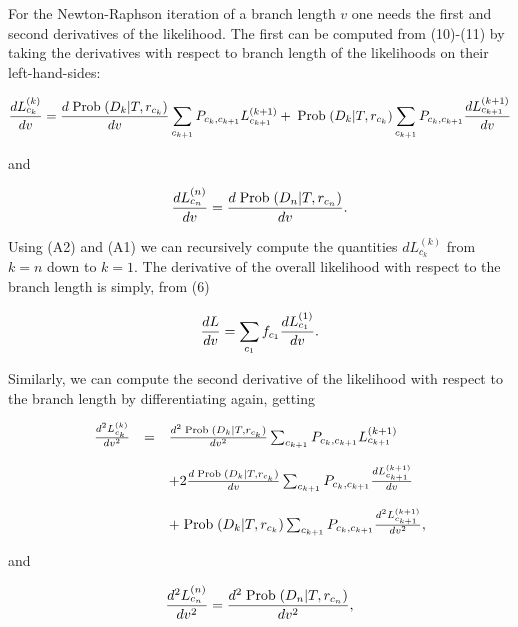 \documentclass[12pt]{article}
\begin{document}
For the Newton-Raphson iteration of a branch length $v$ one needs the first and
second derivatives
of the likelihood.  The first can be computed from (10)-(11) by taking
the derivatives with respect to branch length of the likelihoods on their left-hand-sides:

\begin{equation}%
{dL_{c_k}^{(k)} \over dv} = {d\prob(D_k|T, r_{c_k}) \over dv}\sum_{c_{k+1}} P_{c_k,c_{k+1}} L_{c_{k+1}}^{(k+1)}
+ \prob(D_k|T, r_{c_k})\sum_{c_{k+1}} P_{c_k,c_{k+1}} {dL_{c_{k+1}}^{(k+1)} \over dv}
\end{equation}

and

\begin{equation}%
{dL_{c_n}^{(n)} \over dv} = {d\prob(D_n|T, r_{c_n}) \over dv}.
\end{equation}

Using (A2) and (A1) we can recursively compute the quantities $dL_{c_k}^{(k)}$
from $k=n$ down to $k=1$.   The derivative of the overall likelihood with
respect to the branch length is simply, from (6)

\begin{equation}%
{dL \over dv}  = \sum_{c_1} f_{c_1} {dL_{c_1}^{(1)} \over dv}.
\end{equation}

Similarly, we can compute the second derivative of the likelihood with respect
to the branch length by differentiating again, getting

\begin{equation}%
\begin{array}{c c l}
{d^2L_{c_k}^{(k)} \over dv^2} & = & {d^2\prob(D_k|T, r_{c_k}) \over dv^2}\sum_{c_{k+1}} P_{c_k,c_{k+1}} L_{c_{k+1}}^{(k+1)}\\
& & \\
& & + 2 {d\prob(D_k|T, r_{c_k}) \over dv}\sum_{c_{k+1}} P_{c_k,c_{k+1}} {dL_{c_{k+1}}^{(k+1)} \over dv}\\
& & \\
& & + \prob(D_k|T, r_{c_k})\sum_{c_{k+1}} P_{c_k,c_{k+1}} {d^2L_{c_{k+1}}^{(k+1)} \over dv^2},
\end{array}
\end{equation}

\noindent
and

\begin{equation}%
{d^2L_{c_n}^{(n)} \over dv^2} = {d^2\prob(D_n|T, r_{c_n}) \over dv^2},
\end{equation}
\end{document}
